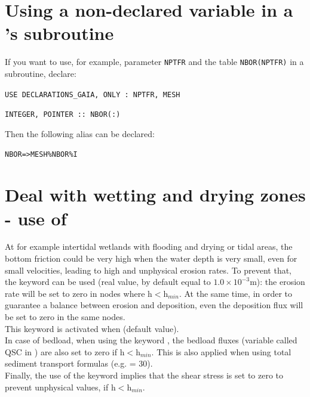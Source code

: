 
\section{Using a non-declared variable in a \gaia{}'s subroutine}
If you want to use, for example, parameter \texttt{NPTFR} and the table \texttt{NBOR(NPTFR)} in a subroutine,
declare:

\texttt{USE DECLARATIONS\_GAIA, ONLY : NPTFR, MESH}

\texttt{INTEGER, POINTER :: NBOR(:)}

Then the following alias can be declared:

\texttt{NBOR=>MESH\%NBOR\%I}

\section{Deal with wetting and drying zones - use of
}
At for example intertidal wetlands with flooding and drying or tidal areas, the
bottom friction could be very high when the water depth is very small, even for
small velocities, leading to high and unphysical erosion rates. To prevent that,
the keyword  can be used (real value,
by default equal to $1.0 \times 10^{-3}$m): the erosion rate will be set to zero
in nodes where h$<$h$_{min}$.
At the same time, in order to guarantee a balance between erosion and
deposition, even the deposition flux will be set to zero in the same nodes.\\
This keyword is activated when  (default value). \\
In case of bedload, when using the keyword
,
the bedload fluxes (variable called QSC in \gaia) are also set to
zero if h$<$h$_{min}$. This is also applied when using total sediment transport
formulas (e.g. 
{\ttfamily= 30}). \\
Finally, the use of the keyword 
implies that the shear stress is set to zero to prevent unphysical values, if
h$<$h$_{min}$.
